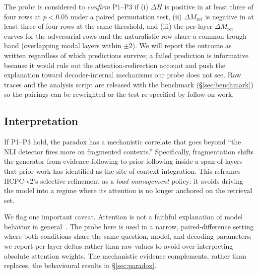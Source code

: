 The probe is considered to \emph{confirm} P1--P3 if (i) $\Delta H$ is
positive in at least three of four rows at $p < 0.05$ under a paired
permutation test, (ii) $\Delta M_{\text{ret}}$ is negative in at least
three of four rows at the same threshold, and (iii) the per-layer
$\Delta M_{\text{ret}}$ curves for the adversarial rows and the
naturalistic row share a common trough band (overlapping modal layers
within $\pm 2$). We will report the outcome as written regardless of
which predictions survive; a failed prediction is informative because it
would rule out the attention-redirection account and push the
explanation toward decoder-internal mechanisms our probe does not see.
Raw traces and the analysis script are released with the benchmark
(§\ref{sec:benchmark}) so the pairings can be reweighted or the test
re-specified by follow-on work.



\subsection{Interpretation}

If P1--P3 hold, the paradox has a mechanistic correlate that goes beyond
``the NLI detector fires more on fragmented contexts.'' Specifically,
fragmentation shifts the generator from evidence-following to
prior-following inside a span of layers that prior work has identified as
the site of context integration. This reframes HCPC-v2's selective
refinement as a \emph{load-management} policy: it avoids driving the
model into a regime where its attention is no longer anchored on the
retrieval set.

We flag one important caveat. Attention is not a faithful explanation of
model behavior in general~\citep{jain2019attention,wiegreffe2019attention}.
The probe here is used in a narrow, paired-difference setting where both
conditions share the same question, model, and decoding parameters; we
report per-layer deltas rather than raw values to avoid over-interpreting
absolute attention weights. The mechanistic evidence complements, rather
than replaces, the behavioural results in §\ref{sec:paradox}.
